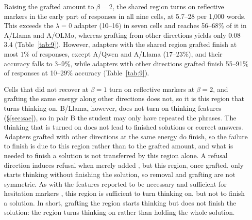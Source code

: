 Raising the grafted amount to $\beta=2$, the shared region turns on reflective markers in the early part of responses in all nine cells, at 5.7--28 per 1,000 words. This exceeds the $\lambda=0$ adapter (10--16) in seven cells and reaches 56--68\% of it in A/Llama and A/OLMo, whereas grafting from other directions yields only 0.08--3.4 (Table~\ref{tab:9}). However, adapters with the shared region grafted finish at most 1\% of responses, except A/Qwen and A/Llama (17--23\%), and their accuracy falls to 3--9\%, while adapters with other directions grafted finish 55--91\% of responses at 10--29\% accuracy (Table~\ref{tab:9}).

Cells that did not recover at $\beta=1$ turn on reflective markers at $\beta=2$, and grafting the same energy along other directions does not, so it is this region that turns thinking on. B/Llama, however, does not turn on thinking features (\S\ref{sec:sae}), so in pair B the student may only have repeated the phrases. The thinking that is turned on does not lead to finished solutions or correct answers. Adapters grafted with other directions at the same energy do finish, so the failure to finish is due to this region rather than to the grafted amount, and what is needed to finish a solution is not transferred by this region alone. A refusal direction induces refusal when merely added \citep{arditi2024refusal}, but this region, once grafted, only starts thinking without finishing the solution, so removal and grafting are not symmetric. As with the features reported to be necessary and sufficient for hesitation markers \citep{hu2026transcoder}, this region is sufficient to turn thinking on, but not to finish a solution. In short, grafting the region starts thinking but does not finish the solution: the region turns thinking on rather than holding the whole solution.

\begin{table}[t]
\centering
\small

\caption{Reflective-marker frequency and response length when components of the $\lambda=0$ adapter are added to the $\lambda=1$ adapter. graft shared adds the shared-region component, graft other adds the same energy taken from outside the shared region, and graft whole adds the whole $\lambda=0$ update scaled to the same energy. Recovered is the recovery rate measured above the $\lambda=1$ level, (graft shared $-$ $\lambda=1$)/($\lambda=0$ $-$ $\lambda=1$). The table separates whether the shared region alone brings back thinking or only length. Values after $\pm$ are standard deviations across three seeds.}
\label{tab:8}
\end{table}

